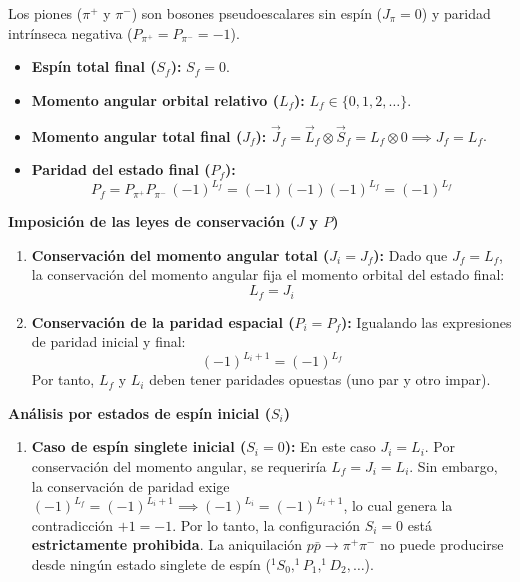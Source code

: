 \begin{problema}
Los piones ($\pi^+$ y $\pi^-$) son bosones pseudoescalares sin espín ($J_\pi = 0$) y paridad intrínseca negativa ($P_{\pi^+} = P_{\pi^-} = -1$).
\begin{itemize}
    \item \textbf{Espín total final ($S_f$):} $S_f = 0$.
    \item \textbf{Momento angular orbital relativo ($L_f$):} $L_f \in \{0, 1, 2, \dots\}$.
    \item \textbf{Momento angular total final ($J_f$):} $\vec{J}_f = \vec{L}_f \otimes \vec{S}_f = L_f \otimes 0 \implies J_f = L_f$.
    \item \textbf{Paridad del estado final ($P_f$):}
    \begin{equation*}
        P_f = P_{\pi^+} P_{\pi^-} \, (-1)^{L_f} = (-1)(-1)(-1)^{L_f} = (-1)^{L_f}
    \end{equation*}
\end{itemize}

\textbf{Imposición de las leyes de conservación ($J$ y $P$)}

\begin{enumerate}[label=\arabic*.]
    \item \textbf{Conservación del momento angular total ($J_i = J_f$):}
    Dado que $J_f = L_f$, la conservación del momento angular fija el momento orbital del estado final:
    \begin{equation*}
        L_f = J_i
    \end{equation*}

    \item \textbf{Conservación de la paridad espacial ($P_i = P_f$):}
    Igualando las expresiones de paridad inicial y final:
    \begin{equation*}
        (-1)^{L_i + 1} = (-1)^{L_f}
    \end{equation*}
    Por tanto, $L_f$ y $L_i$ deben tener paridades opuestas (uno par y otro impar).
\end{enumerate}

\textbf{Análisis por estados de espín inicial ($S_i$)}

\begin{enumerate}[label=\arabic*.]
    \item \textbf{Caso de espín singlete inicial ($S_i = 0$):}
    En este caso $J_i = L_i$. Por conservación del momento angular, se requeriría $L_f = J_i = L_i$.
    Sin embargo, la conservación de paridad exige $(-1)^{L_f} = (-1)^{L_i + 1} \implies (-1)^{L_i} = (-1)^{L_i + 1}$, lo cual genera la contradicción $+1 = -1$.
    Por lo tanto, la configuración $S_i = 0$ está \textbf{estrictamente prohibida}. La aniquilación $p\bar{p} \to \pi^+\pi^-$ no puede producirse desde ningún estado singlete de espín ($^1S_0, ^1P_1, ^1D_2, \dots$).


\end{enumerate}
\end{problema}

